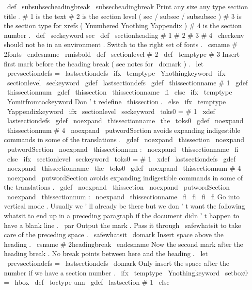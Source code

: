 {{{{\
def
\
subsubsecheadingbreak
{
\
subsecheadingbreak
}
%
Print
any
size
any
type
section
title
.
%
%
#
1
is
the
text
#
2
is
the
section
level
(
sec
/
subsec
/
subsubsec
)
#
3
is
%
the
section
type
for
xrefs
(
Ynumbered
Ynothing
Yappendix
)
#
4
is
the
%
section
number
.
%
\
def
\
seckeyword
{
sec
}
%
\
def
\
sectionheading
#
1
#
2
#
3
#
4
{
%
{
%
\
checkenv
{
}
%
should
not
be
in
an
environment
.
%
%
Switch
to
the
right
set
of
fonts
.
\
csname
#
2fonts
\
endcsname
\
rmisbold
%
\
def
\
sectionlevel
{
#
2
}
%
\
def
\
temptype
{
#
3
}
%
%
%
Insert
first
mark
before
the
heading
break
(
see
notes
for
\
domark
)
.
\
let
\
prevsectiondefs
=
\
lastsectiondefs
\
ifx
\
temptype
\
Ynothingkeyword
\
ifx
\
sectionlevel
\
seckeyword
\
gdef
\
lastsectiondefs
{
\
gdef
\
thissectionname
{
#
1
}
\
gdef
\
thissectionnum
{
}
%
\
gdef
\
thissection
{
\
thissectionname
}
}
%
\
fi
\
else
\
ifx
\
temptype
\
Yomitfromtockeyword
%
Don
'
t
redefine
\
thissection
.
\
else
\
ifx
\
temptype
\
Yappendixkeyword
\
ifx
\
sectionlevel
\
seckeyword
\
toks0
=
{
#
1
}
%
\
xdef
\
lastsectiondefs
{
%
\
gdef
\
noexpand
\
thissectionname
{
\
the
\
toks0
}
%
\
gdef
\
noexpand
\
thissectionnum
{
#
4
}
%
%
\
noexpand
\
putwordSection
avoids
expanding
indigestible
%
commands
in
some
of
the
translations
.
\
gdef
\
noexpand
\
thissection
{
\
noexpand
\
putwordSection
{
}
\
noexpand
\
thissectionnum
:
\
noexpand
\
thissectionname
}
%
}
%
\
fi
\
else
\
ifx
\
sectionlevel
\
seckeyword
\
toks0
=
{
#
1
}
%
\
xdef
\
lastsectiondefs
{
%
\
gdef
\
noexpand
\
thissectionname
{
\
the
\
toks0
}
%
\
gdef
\
noexpand
\
thissectionnum
{
#
4
}
%
%
\
noexpand
\
putwordSection
avoids
expanding
indigestible
%
commands
in
some
of
the
translations
.
\
gdef
\
noexpand
\
thissection
{
\
noexpand
\
putwordSection
{
}
\
noexpand
\
thissectionnum
:
\
noexpand
\
thissectionname
}
%
}
%
\
fi
\
fi
\
fi
\
fi
%
%
Go
into
vertical
mode
.
Usually
we
'
ll
already
be
there
but
we
%
don
'
t
want
the
following
whatsit
to
end
up
in
a
preceding
paragraph
%
if
the
document
didn
'
t
happen
to
have
a
blank
line
.
\
par
%
%
Output
the
mark
.
Pass
it
through
\
safewhatsit
to
take
care
of
%
the
preceding
space
.
\
safewhatsit
\
domark
%
%
Insert
space
above
the
heading
.
\
csname
#
2headingbreak
\
endcsname
%
%
Now
the
second
mark
after
the
heading
break
.
No
break
points
%
between
here
and
the
heading
.
\
let
\
prevsectiondefs
=
\
lastsectiondefs
\
domark
%
%
Only
insert
the
space
after
the
number
if
we
have
a
section
number
.
\
ifx
\
temptype
\
Ynothingkeyword
\
setbox0
=
\
hbox
{
}
%
\
def
\
toctype
{
unn
}
%
\
gdef
\
lastsection
{
#
1
}
%
\
else
}}}}}}
